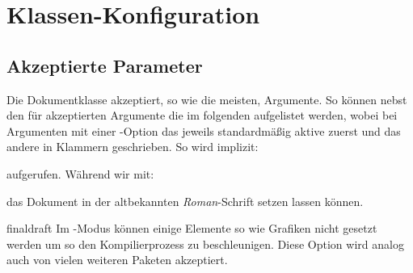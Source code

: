 \documentclass{sopra-base}
\begin{document}
%
%
%
%

\section{Klassen-Konfiguration}    
    \subsection{Akzeptierte Parameter}
    Die Dokumentklasse akzeptiert, so wie die meisten, Argumente. So können
    nebst den für  akzeptierten Argumente die im folgenden
    aufgelistet werden, wobei bei Argumenten mit einer -Option
    das jeweils standardmäßig aktive zuerst und das andere in Klammern
    geschrieben. So wird implizit:
    aufgerufen. Während wir mit:
    das Dokument in der altbekannten \emph{Roman}-Schrift setzen lassen können.

    \begin{argument}{final}{draft}
        Im -Modus können einige Elemente so wie Grafiken nicht
        gesetzt werden um so den Kompilierprozess zu beschleunigen. 
        Diese Option wird analog auch von vielen weiteren Paketen akzeptiert.
    \end{argument}
\end{document}
